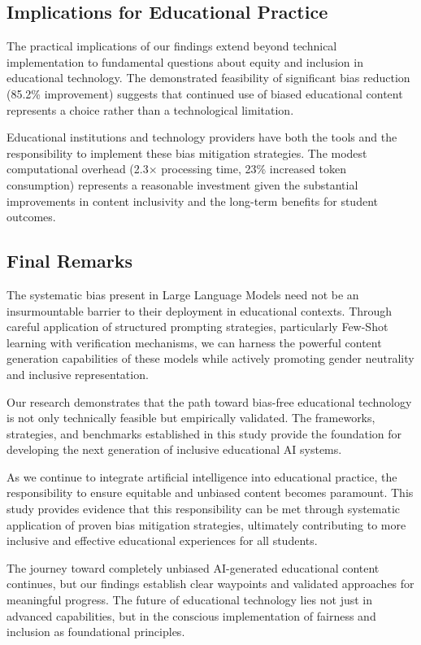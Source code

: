 \subsection{Implications for Educational Practice}

The practical implications of our findings extend beyond technical implementation to fundamental questions about equity and inclusion in educational technology. The demonstrated feasibility of significant bias reduction (85.2\% improvement) suggests that continued use of biased educational content represents a choice rather than a technological limitation.

Educational institutions and technology providers have both the tools and the responsibility to implement these bias mitigation strategies. The modest computational overhead (2.3× processing time, 23\% increased token consumption) represents a reasonable investment given the substantial improvements in content inclusivity and the long-term benefits for student outcomes.

\subsection{Final Remarks}

The systematic bias present in Large Language Models need not be an insurmountable barrier to their deployment in educational contexts. Through careful application of structured prompting strategies, particularly Few-Shot learning with verification mechanisms, we can harness the powerful content generation capabilities of these models while actively promoting gender neutrality and inclusive representation.

Our research demonstrates that the path toward bias-free educational technology is not only technically feasible but empirically validated. The frameworks, strategies, and benchmarks established in this study provide the foundation for developing the next generation of inclusive educational AI systems.

As we continue to integrate artificial intelligence into educational practice, the responsibility to ensure equitable and unbiased content becomes paramount. This study provides evidence that this responsibility can be met through systematic application of proven bias mitigation strategies, ultimately contributing to more inclusive and effective educational experiences for all students.

The journey toward completely unbiased AI-generated educational content continues, but our findings establish clear waypoints and validated approaches for meaningful progress. The future of educational technology lies not just in advanced capabilities, but in the conscious implementation of fairness and inclusion as foundational principles.